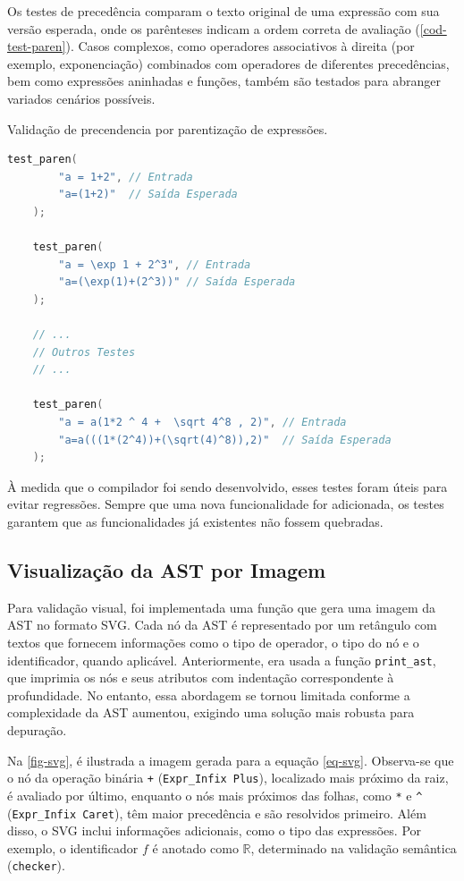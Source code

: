 Os testes de precedência comparam o texto original de uma expressão com sua versão esperada, onde os parênteses indicam a ordem correta de avaliação (\autoref{cod-test-paren}). Casos complexos, como operadores associativos à direita (por exemplo, exponenciação) combinados com operadores de diferentes precedências, bem como expressões aninhadas e funções, também são testados para abranger variados cenários possíveis.


\begin{codigo}[!ht]
    \caption{\small Validação de precendencia por parentização de expressões. }
        \label{cod-test-paren}
  \begin{lstlisting}[language = C]
    test_paren(
        "a = 1+2", // Entrada
        "a=(1+2)"  // Saída Esperada
    );

    test_paren(
        "a = \exp 1 + 2^3", // Entrada
        "a=(\exp(1)+(2^3))" // Saída Esperada
    );

    // ...
    // Outros Testes
    // ...

    test_paren(
        "a = a(1*2 ^ 4 +  \sqrt 4^8 , 2)", // Entrada
        "a=a(((1*(2^4))+(\sqrt(4)^8)),2)"  // Saída Esperada
    );
  \end{lstlisting}
\end{codigo}

À medida que o compilador foi sendo desenvolvido, esses testes foram úteis para evitar regressões. Sempre que uma nova funcionalidade for adicionada, os testes garantem que as funcionalidades já existentes não fossem quebradas.




\subsection{Visualização da AST por Imagem} \label{subsection-svg}

Para validação visual, foi implementada uma função que gera uma imagem da AST no formato SVG. Cada nó da AST é representado por um retângulo com textos que fornecem informações como o tipo de operador, o tipo do nó e o identificador, quando aplicável. Anteriormente, era usada a função \texttt{print\_ast}, que imprimia os nós e seus atributos com indentação correspondente à profundidade. No entanto, essa abordagem se tornou limitada conforme a complexidade da AST aumentou, exigindo uma solução mais robusta para depuração.

Na \autoref{fig-svg}, é ilustrada a imagem gerada para a equação \autoref{eq-svg}. Observa-se que o nó da operação binária \texttt{+} (\verb"Expr_Infix Plus"), localizado mais próximo da raiz, é avaliado por último, enquanto o nós mais próximos das folhas, como \texttt{*} e \texttt{\^} (\verb"Expr_Infix Caret"), têm maior precedência e são resolvidos primeiro. Além disso, o SVG inclui informações adicionais, como o tipo das expressões. Por exemplo, o identificador \( f \) é anotado como \( \mathbb{R} \), determinado na validação semântica (\texttt{checker}).

